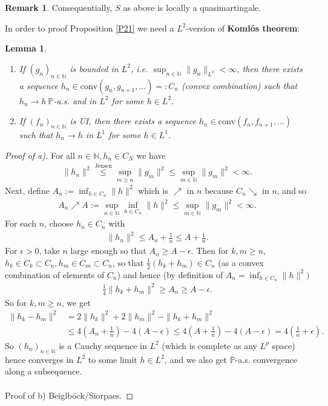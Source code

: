 \documentclass[12pt,a4paper, twoside]{article}
\newtheorem{lem}{Lemma}[section]
\theoremstyle{definition}
\newtheorem{rem}{Remark}[section]
\newcommand{\PP}{\mathbb{P}} %
\begin{document}
\begin{rem} Consequentially, $S$ as above is locally a quasimartingale. 
\end{rem}
In order to proof Proposition \ref{P21} we need a $L^2$-version of \textbf{Komlós theorem}: 
\begin{lem} \label{L22} \
\begin{enumerate}[label=(\alph*)]
\item If $(g_n)_{n \in \mathbb{N}}$ is bounded in $L^2$, i.e. $\sup_{n \in \mathbb{N}} \|g_n\|_{L^2}< \infty$, then there exists a sequence $h_n \in \text{conv}(g_n,g_{n+1}, \dots )=:C_n$ (convex combination) such that $h_n \to h \ \PP$-a.s. and in $L^2$ for some $h \in L^2$. 
\item If $(f_n)_{n \in \mathbb{N}}$ is UI, then there exists a sequence $h_n \in \text{conv}(f_n, f_{n+1}, \dots )$ such that $h_n \to h$ in $L^1$ for some $h \in L^1$. 
\end{enumerate}
\end{lem}
\newpage
\begin{proof}[Proof of a)] For all $n \in \mathbb{N}, h_n \in C_N$ we have
\begin{align*}
\|h_n\|^2 \overset{\text{Jensen}}\leq \sup_{m \geq n } \|g_m\|^2 \leq \sup_{m \in \mathbb{N}} \|g_m\|^2 < \infty.
\end{align*}
Next, define $A_n:= \inf_{h \in C_n} \|h\|^2$ which is $\nearrow$ in $n$ because $C_n \searrow$ in $n$, and so 
\begin{align*}
A_n \nearrow A := \sup_{n \in \mathbb{N}} \inf_{h \in C_n} \|h\|^2 \leq \sup_{m \in \mathbb{N}} \|g_m\|^2 < \infty.
\end{align*}
For each $n$, choose $h_n \in C_n$ with 
\begin{align*}
\|h_n\|^2 \leq A_n + \frac{1}{n} \leq A +\frac{1}{n}.
\end{align*}
For $\epsilon>0$, take $n$ large enough so that $A_n \geq A- \epsilon$. Then for $k,m \geq n$, $h_k \in C_k \subset C_n, h_m \in C_m \subset C_n$, so that $\frac{1}{2}(h_k+h_m) \in C_n$ (as a convex combination of elements of $C_n$) and hence (by definition of $A_n= \inf_{h \in C_n} \|h\|^2)$
\begin{align*}
\frac{1}{4} \|h_k + h_m\|^2 \geq A_n \geq A- \epsilon.
\end{align*}
So for $k,m \geq n$, we get 
\begin{align*}
\|h_k-h_m\|^2 &= 2 \|h_k\|^2 + 2 \|h_m\|^2 - \|h_k + h_m\|^2  \\
& \leq 4 \left(A_n + \frac{1}{n}\right) - 4(A- \epsilon) \leq 4\left(A+ \frac{1}{n}\right) -4(A- \epsilon) = 4 \left( \frac{1}{n} + \epsilon \right).
\end{align*}
So $(h_n)_{n \in \mathbb{N}}$ is a Cauchy sequence in $L^2$ (which is complete as any $L^p$ space) hence converges in $L^2$ to some limit $h \in L^2$, and we also get $\PP$-a.s. convergence along a subsequence. 
\\
\\
Proof of b) Beiglböck/Siorpaes.
\end{proof}
\end{document}
